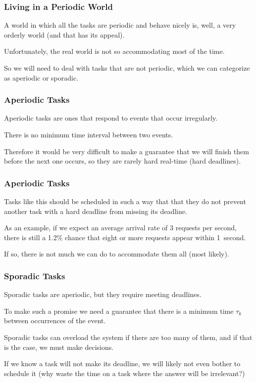 \begin{frame}
\frametitle{Living in a Periodic World}

A world in which all the tasks are periodic and behave nicely is, well, a very orderly world (and that has its appeal). 

Unfortunately, the real world is not so accommodating most of the time. 

So we will need to deal with tasks that are not periodic, which we can categorize as \alert{aperiodic} or \alert{sporadic}.

\end{frame}

\begin{frame}
\frametitle{Aperiodic Tasks}

Aperiodic tasks are ones that respond to events that occur irregularly. 

There is no minimum time interval between two events.

Therefore it would be very difficult to make a guarantee that we will finish them before the next one occurs, so they are rarely hard real-time (hard deadlines). 

\end{frame}

\begin{frame}
\frametitle{Aperiodic Tasks}

Tasks like this should be scheduled in such a way that that they do not prevent another task with a hard deadline from missing its deadline. 

As an example, if we expect an average arrival rate of 3 requests per second, there is still a 1.2\% chance that eight or more requests appear within 1~second. 

If so, there is not much we can do to accommodate them all (most likely).

\end{frame}

\begin{frame}
\frametitle{Sporadic Tasks}

Sporadic tasks are aperiodic, but they require meeting deadlines. 

To make such a promise we need a guarantee that there is a minimum time $\tau_{k}$ between occurrences of the event. 

Sporadic tasks can overload the system if there are too many of them, and if that is the case, we must make decisions. 

If we know a task will not make its deadline, we will likely not even bother to schedule it (why waste the time on a task where the answer will be irrelevant?)


\end{frame}

